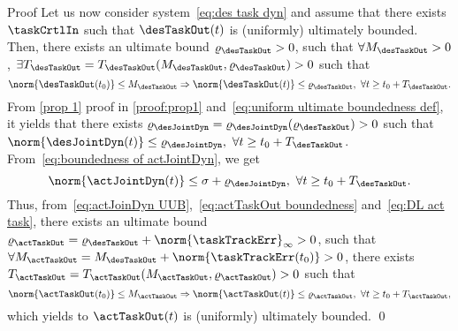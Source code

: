 \begin{custumProof}{Proof}
	Let us now consider system~\eqref{eq:des task dyn} and assume that there exists $\taskCrtlIn$ such that $\desTaskOut(t) $ is (uniformly) ultimately bounded. Then, there exists an ultimate bound $\varrho_{\desTaskOut}>0$, such that $\forall {M}_{\desTaskOut}>0$, $\exists T_{\desTaskOut}=T_{\desTaskOut}(M_{\desTaskOut},\varrho_{\desTaskOut})>0$ such that~\cite[Definition~4.6]{khalil2002NonLinearSystems}
	\begin{equation}\label{eq:uniform ultimate boundedness def}
		\norm{\desTaskOut(t_0)}\leq M_{\desTaskOut} \Rightarrow \norm{\desTaskOut(t) } \leq \varrho_{\desTaskOut}, \ \forall t\geq t_0 +T_{\desTaskOut}.
	\end{equation}
	From \cref{prop 1} proof in \cref{proof:prop1} and~\eqref{eq:uniform ultimate boundedness def}, it yields that there exists $\varrho_{\desJointDyn}=\varrho_{\desJointDyn}(\varrho_{\desTaskOut})>0$ such that $\norm{\desJointDyn(t)}\leq\varrho_{\desJointDyn}, \ \forall t\geq t_0 +T_{\desTaskOut}$. From~\eqref{eq:boundedness of actJointDyn}, we get 
	\begin{equation}\label{eq:actJoinDyn UUB}
		\norm{\actJointDyn(t)} \leq \sigma + \varrho_{\desJointDyn}, \ \forall t\geq t_0 +T_{\desTaskOut}.
	\end{equation}
	Thus, from~\eqref{eq:actJoinDyn UUB},~\eqref{eq:actTaskOut boundedness} and~\eqref{eq:DL act task}, 
	there exists an ultimate bound $\varrho_{\actTaskOut}= \varrho_{\desTaskOut} +\norm{\taskTrackErr }_\infty>0$, such that $\forall {M}_{\actTaskOut}=M_{\desTaskOut} + \norm{\taskTrackErr(t_0)}>0$, there exists $ T_{\actTaskOut}=T_{\actTaskOut}({M}_{\actTaskOut},\varrho_{\actTaskOut})>0$ such that 
	\begin{equation}
		\norm{\actTaskOut(t_0)}\leq {M}_{\actTaskOut} \Rightarrow \norm{\actTaskOut(t)} \leq \varrho_{\actTaskOut}, \ \forall t\geq t_0 + T_{\actTaskOut},
	\end{equation} which yields to $\actTaskOut(t) $ is (uniformly) ultimately bounded.
	\qed\end{custumProof}
